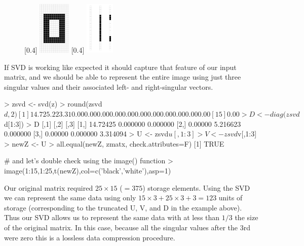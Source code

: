 \begin{R}
\begin{figure}[ht!]
\begin{center}
[0.4\linewidth]{%
\includegraphics[height=1in]{./figures/hands-on7/zero.jpg}%
}
[0.4\linewidth]{%
\includegraphics[height=1in]{./figures/hands-on7/zero-vecs.jpg}%
}
\end{center}
\end{figure}

If SVD is working like expected it should capture that feature of our input matrix, and we should be able to represent the entire image using just three singular values and their associated left- and right-singular vectors.

\begin{R}
> zsvd <- svd(z)
> round(zsvd$d,2)
 [1] 14.72  5.22  3.31  0.00  0.00  0.00  0.00  0.00  0.00  0.00  0.00  0.00  0.00  0.00
[15]  0.00
> D <- diag(zsvd$d[1:3])
> D
         [,1]     [,2]     [,3]
[1,] 14.72425 0.000000 0.000000
[2,]  0.00000 5.216623 0.000000
[3,]  0.00000 0.000000 3.314094
> U <- zsvd$u[,1:3]
> V <- zsvd$v[,1:3]
> newZ <- U %
> all.equal(newZ, zmatx, check.attributes=F)
[1] TRUE

# and let's double check using the image() function
> image(1:15,1:25,t(newZ),col=c('black','white'),asp=1)
\end{R}

Our original matrix required $25 \times 15$ ($= 375$) storage elements. Using the SVD we can represent the same data using only $15 \times 3 + 25 \times 3 + 3 = 123$ units of storage (corresponding to the truncated U, V, and D in the example above). Thus our SVD allows us to represent the same data with at less than $1/3$ the size of the original matrix. In this case, because all the singular values after the 3rd were zero this is a lossless data compression procedure. 


\end{R}
